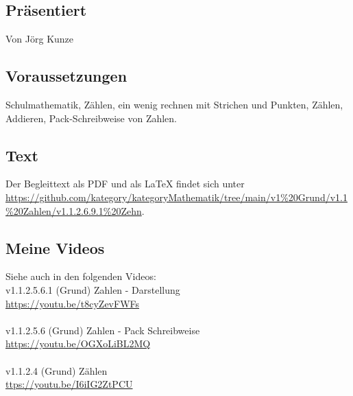 \documentclass[a4paper]{amsart}
\theoremstyle{definition}
\begin{document}
\subsection*{Präsentiert}
Von Jörg Kunze

\subsection*{Voraussetzungen}
Schulmathematik, Zählen, ein wenig rechnen mit Strichen und Punkten, Zählen, Addieren, Pack-Schreibweise von Zahlen.

\subsection*{Text}
Der Begleittext als PDF und als LaTeX findet sich unter
\url{https://github.com/kategory/kategoryMathematik/tree/main/v1%20Grund/v1.1%20Zahlen/v1.1.2.6.9.1%20Zehn}.

\subsection*{Meine Videos}
Siehe auch in den folgenden Videos:\\
v1.1.2.5.6.1 (Grund) Zahlen - Darstellung\\
\url{https://youtu.be/t8cyZevFWFs}\\
\\
v1.1.2.5.6 (Grund) Zahlen - Pack Schreibweise\\
\url{https://youtu.be/OGXoLiBL2MQ}\\
\\
v1.1.2.4 (Grund) Zählen\\
\url{ttps://youtu.be/I6iIG2ZtPCU}\\
\end{document}
